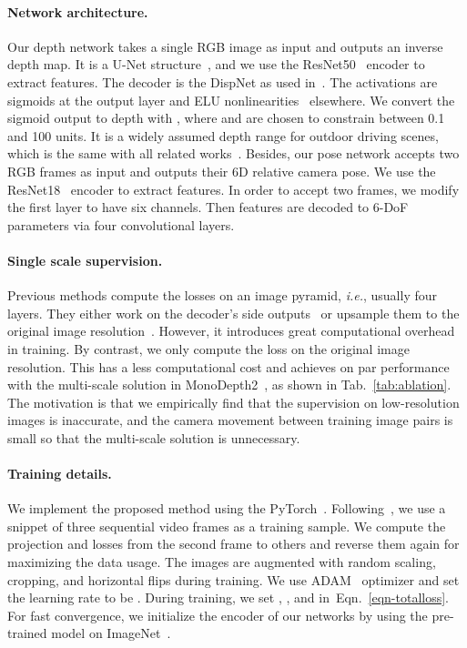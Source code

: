 \documentclass[twocolumn]{svjour3}
\renewcommand{\cite}[1]{\textcolor{blue}{\citep{#1}}}
\def\ie{\emph{i.e.}}
\newcommand{\tabref}[1]{Tab.~\ref{#1}}
\newcommand{\equref}[1]{Eqn.~\ref{#1}}
\begin{document}
\paragraph{Network architecture.}
Our depth network takes a single RGB image as input and outputs 
an inverse depth map.
It is a U-Net structure~\cite{ronneberger2015u}, 
and we use the ResNet50~\cite{He_2016_CVPR} encoder to extract features.
The decoder is the DispNet as used in~\cite{zhou2017unsupervised}.
The activations are sigmoids at the output layer and ELU nonlinearities~\cite{clevert2015fast} elsewhere. 
We convert the sigmoid output  to depth with , 
where  and  are chosen to constrain  between 0.1 and 100 units.
It is a widely assumed depth range for outdoor driving scenes, 
which is the same with all related works~\cite{zhou2017unsupervised,yin2018geonet,ranjan2019cc}.
Besides, our pose network accepts two RGB frames as input and outputs their 6D relative camera pose.
We use the ResNet18~\cite{He_2016_CVPR} encoder to extract features.
In order to accept two frames, 
we modify the first layer to have six channels.
Then features are decoded to 6-DoF parameters via four convolutional layers.

\paragraph{Single scale supervision.}
Previous methods compute the losses on an image pyramid, \ie, usually four layers.
They either work on the decoder's side outputs~\cite{zhou2017unsupervised,yin2018geonet,zou2018df} 
or upsample them to the original image resolution~\cite{monodepth2}.
However, it introduces great computational overhead in training.
By contrast, we only compute the loss on the original image resolution.
This has a less computational cost and achieves on par performance with the multi-scale solution in MonoDepth2~\cite{monodepth2}, as shown in \tabref{tab:ablation}.
The motivation is that we empirically find that the supervision  on low-resolution images is inaccurate,
and the camera movement between training image pairs is small so that the multi-scale solution is unnecessary.


\paragraph{Training details.}
We implement the proposed method using the PyTorch~\cite{paszke2017automatic}.
Following~\cite{zhou2017unsupervised,ranjan2019cc,Wang2018CVPR}, 
we use a snippet of three sequential video frames as a training sample.
We compute the projection and losses from the second frame to others 
and reverse them again for maximizing the data usage.
The images are augmented with random scaling, cropping, and horizontal flips during training.
We use ADAM~\cite{kingma2014adam} optimizer and set the learning rate to be .
During training, we set , , and  in~\equref{eqn-totalloss}.
For fast convergence, we initialize the encoder of our networks by using the pre-trained model on ImageNet~\cite{imagenet_cvpr09}.
\end{document}
